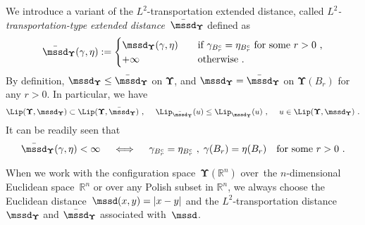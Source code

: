 \documentclass[11pt,letterpaper]{amsart}
\newcommand{\tym}[1]{{\scriptscriptstyle{\times #1}}}
\newcommand{\otym}[1]{{\scriptscriptstyle{\otimes #1}}}
\newcommand{\R}{{\mathbb R}}
\newcommand{\comma}{\,\,\mathrm{,}\;\,}
\newcommand{\fstop}{\,\,\mathrm{.}}
\newcommand{\QP}{{\mu}}
\newcommand{\dUpsilon}{{\mathbf \Upsilon}}
\newcommand{\U}{\dUpsilon}
\renewcommand{\1}{\mathbf 1}
\numberwithin{equation}{section}
\theoremstyle{plain}
\theoremstyle{definition}
\theoremstyle{remark}
\begin{document}
We introduce a variant of the $L^2$-transportation extended distance, called \emph{$L^2$-transportation-type}  \emph{extended distance}~$\bar{\mssd}_\U$ defined as 
\begin{align} \label{eq:dW2L}
\bar{\mssd}_\U(\gamma, \eta):=
\begin{cases}
\mssd_\U(\gamma, \eta) \quad &\text{if $\gamma_{B_r^c}=\eta_{B_r^c}$ for some $r>0$\ ,}
\\
+\infty \quad  &\text{otherwise} \fstop
\end{cases}
\end{align}
By definition, $\mssd_\U \le \bar{\mssd}_\U$ on $\U$,  and  $\mssd_\U = \bar{\mssd}_\U$ on $\U(B_r)$ for any $r>0$. In particular, we have 
\begin{align} \label{e:LLR}
\Lip(\U, \mssd_\U) \subset \Lip(\U, \bar{\mssd}_\U) \comma \quad \Lip_{\bar{\mssd}_\U}(u) \le  \Lip_{\mssd_\U}(u)\comma  \quad u \in \Lip(\U, \mssd_\U)\fstop
\end{align}
It can be readily seen that 
\begin{align} \label{e:LLR2}
\bar{\mssd}_\U(\gamma, \eta) <\infty \quad \iff \quad \gamma_{B_r^c}=\eta_{B_r^c} \comma \gamma(B_r)=\eta(B_r) \quad \text{for some $r>0$}\fstop
\end{align}

When we work with the configuration space~$\U(\R^n)$ over~the $n$-dimensional Euclidean space~$\R^n$ or over any Polish subset in $\R^n$, we always choose the Euclidean distance~$\mssd(x, y)=|x-y|$ and the $L^2$-transportation distance~$\mssd_{\U}$ and $\bar{\mssd}_\U$ associated with~$\mssd$.  


\end{document}
